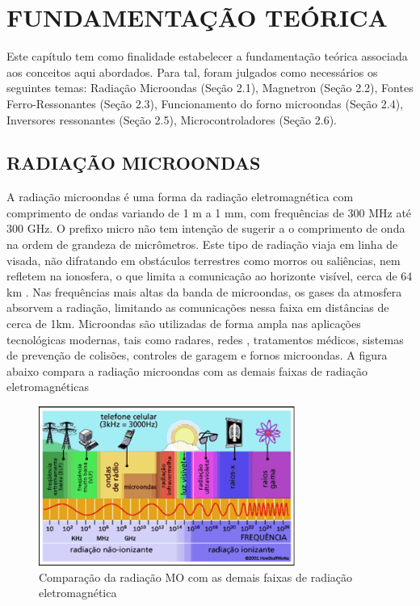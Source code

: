 
\chapter{FUNDAMENTAÇÃO TEÓRICA}
\label{chap:fundamentacaoTeorica}

Este capítulo tem como ﬁnalidade estabelecer a fundamentação teórica associada aos conceitos aqui abordados. Para tal, foram julgados como necessários os seguintes temas: Radiação Microondas (Seção 2.1), Magnetron (Seção 2.2), Fontes Ferro-Ressonantes (Seção 2.3), Funcionamento do forno microondas (Seção 2.4), Inversores ressonantes (Seção 2.5), Microcontroladores (Seção 2.6).

\section{RADIAÇÃO MICROONDAS}
\label{sec:radiacaoMicroondas}

A radiação microondas é uma forma da radiação eletromagnética com comprimento de ondas variando de 1 m a 1 mm, com frequências de 300 MHz até 300 GHz. O prefixo micro não tem intenção de sugerir a o comprimento de onda na ordem de grandeza de micrômetros. Este tipo de radiação viaja em linha de visada, não difratando em obstáculos terrestres como morros ou saliências, nem refletem na ionosfera, o que limita a comunicação ao horizonte visível, cerca de 64 km \cite{hitchcock}. Nas frequências mais altas da banda de microondas, os gases da atmosfera absorvem a radiação, limitando as comunicações nessa faixa em distâncias de cerca de 1km. Microondas são utilizadas de forma ampla nas aplicações tecnológicas modernas, tais como radares, redes , tratamentos médicos, sistemas de prevenção de colisões, controles de garagem e fornos microondas. A figura abaixo compara a radiação microondas com as demais faixas de radiação eletromagnéticas

\begin{figure}[!htb]
    \centering
    \includegraphics[width=0.75\textwidth]{./dados/figuras/figura_microondas}
    \caption{Comparação da radiação MO com as demais faixas de radiação eletromagnética}
    \label{fig:figura-mo}
\end{figure}


